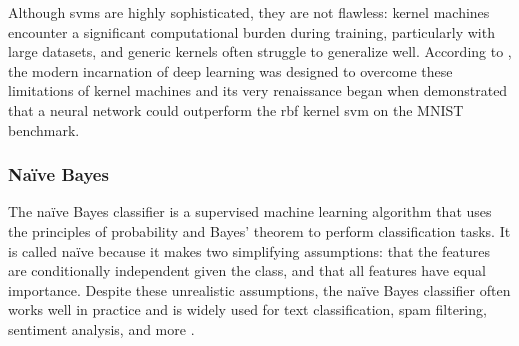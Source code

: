 

Although \gls{svm}s are highly sophisticated, they are not flawless: kernel machines encounter a significant computational burden during training, particularly with large datasets, and generic kernels often struggle to generalize well. According to \textcite{Goodfellow2016}, the modern incarnation of deep learning was designed to overcome these limitations of kernel machines and its very renaissance began when \textcite{Hinton2006} demonstrated that a neural network could outperform the \gls{rbf} kernel \gls{svm} on the MNIST benchmark.


\subsubsection{Naïve Bayes}
\label{subsubsec:machine_learning_GNB}

The naïve Bayes classifier is a supervised machine learning algorithm that uses the principles of probability and Bayes' theorem to perform classification tasks. It is called naïve because it makes two simplifying assumptions: that the features are conditionally independent given the class, and that all features have equal importance. Despite these unrealistic assumptions, the naïve Bayes classifier often works well in practice and is widely used for text classification, spam filtering, sentiment analysis, and more \cite{Barber2012}.



